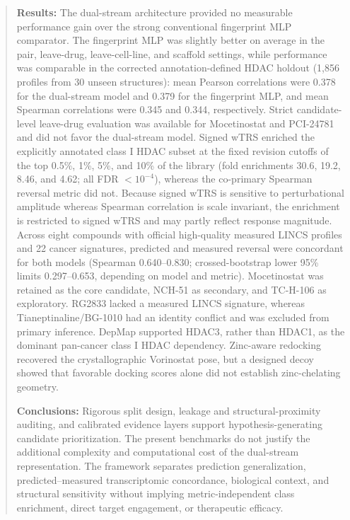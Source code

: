 \begin{abstract}
\begin{roundtworevision}
\textbf{Results:} The dual-stream architecture provided no measurable performance gain over the strong conventional fingerprint MLP comparator. The fingerprint MLP was slightly better on average in the pair, leave-drug, leave-cell-line, and scaffold settings, while performance was comparable in the corrected annotation-defined HDAC holdout (1,856 profiles from 30 unseen structures): mean Pearson correlations were 0.378 for the dual-stream model and 0.379 for the fingerprint MLP, and mean Spearman correlations were 0.345 and 0.344, respectively. Strict candidate-level leave-drug evaluation was available for Mocetinostat and PCI-24781 and did not favor the dual-stream model. Signed wTRS enriched the explicitly annotated class I HDAC subset at the fixed revision cutoffs of the top 0.5\%, 1\%, 5\%, and 10\% of the library (fold enrichments 30.6, 19.2, 8.46, and 4.62; all FDR $<10^{-4}$), whereas the co-primary Spearman reversal metric did not. Because signed wTRS is sensitive to perturbational amplitude whereas Spearman correlation is scale invariant, the enrichment is restricted to signed wTRS and may partly reflect response magnitude. Across eight compounds with official high-quality measured LINCS profiles and 22 cancer signatures, predicted and measured reversal were concordant for both models (Spearman 0.640--0.830; crossed-bootstrap lower 95\% limits 0.297--0.653, depending on model and metric). Mocetinostat was retained as the core candidate, NCH-51 as secondary, and TC-H-106 as exploratory. RG2833 lacked a measured LINCS signature, whereas Tianeptinaline/BG-1010 had an identity conflict and was excluded from primary inference. DepMap supported HDAC3, rather than HDAC1, as the dominant pan-cancer class I HDAC dependency. Zinc-aware redocking recovered the crystallographic Vorinostat pose, but a designed decoy showed that favorable docking scores alone did not establish zinc-chelating geometry.

\textbf{Conclusions:} Rigorous split design, leakage and structural-proximity auditing, and calibrated evidence layers support hypothesis-generating candidate prioritization. The present benchmarks do not justify the additional complexity and computational cost of the dual-stream representation. The framework separates prediction generalization, predicted--measured transcriptomic concordance, biological context, and structural sensitivity without implying metric-independent class enrichment, direct target engagement, or therapeutic efficacy.
\end{roundtworevision}
\end{abstract}

